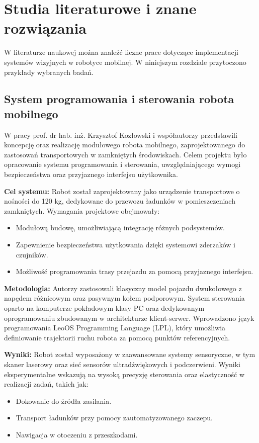 \documentclass[a4paper,twoside,12pt]{book}
\begin{document}
\section{Studia literaturowe i znane rozwiązania}
W literaturze naukowej można znaleźć liczne prace dotyczące implementacji systemów wizyjnych w robotyce mobilnej. W niniejszym rozdziale przytoczono przykłady wybranych badań.

\subsection{System programowania i sterowania robota mobilnego}

W pracy \cite{bib:mikekus2014system} prof. dr hab. inż. Krzysztof Kozłowski i współautorzy przedstawili koncepcję oraz realizację modułowego robota mobilnego, zaprojektowanego do zastosowań transportowych w zamkniętych środowiskach. Celem projektu było opracowanie systemu programowania i sterowania, uwzględniającego wymogi bezpieczeństwa oraz przyjaznego interfejsu użytkownika.

\textbf{Cel systemu:}
Robot został zaprojektowany jako urządzenie transportowe o nośności do 120 kg, dedykowane do przewozu ładunków w pomieszczeniach zamkniętych. Wymagania projektowe obejmowały:
\begin{itemize}
    \item Modułową budowę, umożliwiającą integrację różnych podsystemów.
    \item Zapewnienie bezpieczeństwa użytkowania dzięki systemowi zderzaków i czujników.
    \item Możliwość programowania trasy przejazdu za pomocą przyjaznego interfejsu.
\end{itemize}

\textbf{Metodologia:}
Autorzy zastosowali klasyczny model pojazdu dwukołowego z napędem różnicowym oraz pasywnym kołem podporowym. System sterowania oparto na komputerze pokładowym klasy PC oraz dedykowanym oprogramowaniu zbudowanym w architekturze klient-serwer. Wprowadzono język programowania LeoOS Programming Language (LPL), który umożliwia definiowanie trajektorii ruchu robota za pomocą punktów referencyjnych.

\textbf{Wyniki:}
Robot został wyposażony w zaawansowane systemy sensoryczne, w tym skaner laserowy oraz sieć sensorów ultradźwiękowych i podczerwieni. Wyniki eksperymentalne wskazują na wysoką precyzję sterowania oraz elastyczność w realizacji zadań, takich jak:
\begin{itemize}
    \item Dokowanie do źródła zasilania.
    \item Transport ładunków przy pomocy zautomatyzowanego zaczepu.
    \item Nawigacja w otoczeniu z przeszkodami.
\end{itemize}
\end{document}
